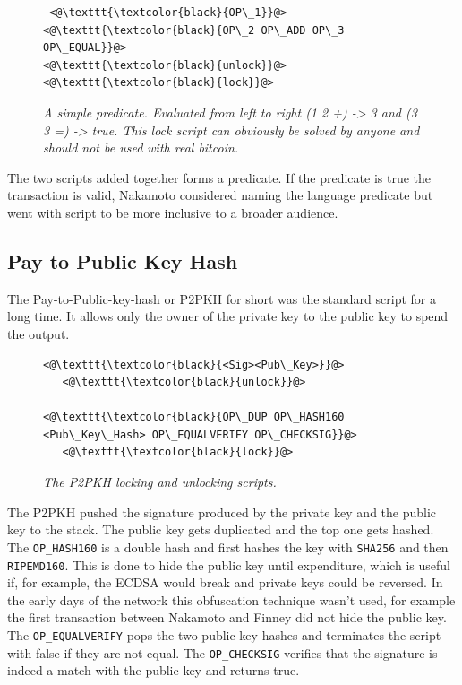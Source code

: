 \begin{figure}[!hbt]
		\centering
	\begin{lstlisting}
 <@\texttt{\textcolor{black}{OP\_1}}@>   <@\texttt{\textcolor{black}{OP\_2 OP\_ADD OP\_3 OP\_EQUAL}}@>
<@\texttt{\textcolor{black}{unlock}}@>           <@\texttt{\textcolor{black}{lock}}@>
	\end{lstlisting}
	
	\caption{\textit{ A simple predicate. Evaluated from left to right (1 2 +) -> 3 and
			(3 3 =) -> true. This lock script can obviously be solved by anyone and should not be used with real bitcoin.
	}}
	\label{fig:simple:script}
\end{figure}

The two scripts added together forms a predicate. If the predicate is true the transaction is valid, Nakamoto considered naming the language predicate but went with script to be more inclusive to a broader audience\cite{nakamoto:predicate}.

\subsection{Pay to Public Key Hash}

The Pay-to-Public-key-hash or P2PKH for short was the standard script for a long time. It allows only the owner of 
the private key to the public key to spend the output.

\begin{figure}[!hbt]
		\centering
	\begin{lstlisting}
<@\texttt{\textcolor{black}{<Sig><Pub\_Key>}}@>   
   <@\texttt{\textcolor{black}{unlock}}@>
   
<@\texttt{\textcolor{black}{OP\_DUP OP\_HASH160 <Pub\_Key\_Hash> OP\_EQUALVERIFY OP\_CHECKSIG}}@>
   <@\texttt{\textcolor{black}{lock}}@>
	\end{lstlisting}
	
	\caption{\textit{ The P2PKH locking and unlocking scripts.
	}}
	\label{fig:P2PKH}
\end{figure}

The P2PKH pushed the signature produced by the private key and the public key to the stack. The public key gets duplicated and the top one gets hashed. The \texttt{OP\_HASH160} is a double hash and first hashes the key with \texttt{SHA256} and then \texttt{RIPEMD160}. This is done to hide the public key until expenditure, which is useful if, for example, the ECDSA would break and private keys could be reversed. In the early days of the network this obfuscation technique wasn't used, for example the first transaction between Nakamoto and Finney did not hide the public key\cite{nakamoto:finney:tx}. The \texttt{OP\_EQUALVERIFY} pops the two public key hashes and terminates the script with false if they are not equal. The \texttt{OP\_CHECKSIG} verifies that the signature is indeed a match with the public key and returns true. 

